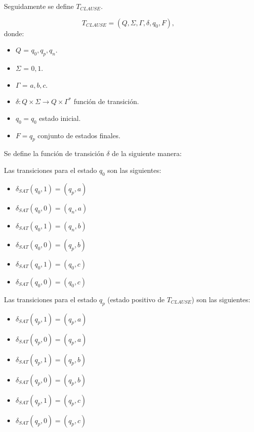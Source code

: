\documentclass[12pt]{article}
\begin{document}
Seguidamente se define $T_{CLAUSE}$.

\[
    T_{CLAUSE} = (Q, {\Sigma}, \Gamma, \delta, q_{0}, F),
\]
donde:
\begin{itemize}
    \item \(Q\) = ${q_0,q_p,q_n}$.
    \item \(\Sigma\) = ${0,1}$.
    \item \(\Gamma\) = ${a,b,c}$.
    \item \(\delta: Q \times \Sigma \to Q \times \Gamma^*\) función de transición.
    \item \(q_{0} = q_0\) estado inicial.
    \item \(F={q_p}\) conjunto de estados finales.
\end{itemize}

Se define la función de transición $\delta$ de la siguiente manera:


Las transiciones para el estado $q_0$ son las siguientes:
\begin{multicols}{2}
    \begin{itemize}
        \item $\delta_{SAT}(q_0,1)=(q_p,a)$
        \item $\delta_{SAT}(q_0,0)=(q_n,a)$
        \item $\delta_{SAT}(q_0,1)=(q_n,b)$
        \item $\delta_{SAT}(q_0,0)=(q_p,b)$
        \item $\delta_{SAT}(q_0,1)=(q_0,c)$
        \item $\delta_{SAT}(q_0,0)=(q_0,c)$
    \end{itemize}
\end{multicols}

Las transiciones para el estado $q_p$ (estado positivo de $T_{CLAUSE}$) son las siguientes:
\begin{multicols}{2}
    \begin{itemize}
        \item $\delta_{SAT}(q_{p},1)=(q_{p},a)$
        \item $\delta_{SAT}(q_{p},0)=(q_{p},a)$
        \item $\delta_{SAT}(q_{p},1)=(q_{p},b)$
        \item $\delta_{SAT}(q_{p},0)=(q_{p},b)$
        \item $\delta_{SAT}(q_{p},1)=(q_{p},c)$
        \item $\delta_{SAT}(q_{p},0)=(q_{p},c)$
    \end{itemize}
\end{multicols}
\end{document}
